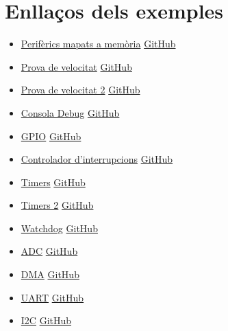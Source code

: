 \chapter*{Enllaços dels exemples}
\begin{itemize}
 \item \hyperref[sub:memory-mapped]{Perifèrics mapats a memòria} \href{https://github.com/mariusmm/cursembedded/tree/master/Simplicity/MemoryMap}{GitHub}
 \item \hyperref[sub:speedtest]{Prova de velocitat} \href{https://github.com/mariusmm/cursembedded/tree/master/Simplicity/SpeedTest_1}{GitHub}
 \item \hyperref[sub:speedtest_example]{Prova de velocitat 2} \href{https://github.com/mariusmm/cursembedded/tree/master/Simplicity/SpeedTest_2}{GitHub}
 \item \hyperref[sub:console_example]{Consola Debug} \href{https://github.com/mariusmm/cursembedded/tree/master/Simplicity/Printf_SWO}{GitHub}
 \item \hyperref[sub:GPIO_2_example]{GPIO} \href{https://github.com/mariusmm/cursembedded/tree/master/GPIO_1}{GitHub}
 \item \hyperref[sec:IRQ_example]{Controlador d'interrupcions} \href{https://github.com/mariusmm/cursembedded/tree/master/Simplicity/GPIO_2}{GitHub}
 \item \hyperref[sub:Timers_exemple]{Timers} \href{https://github.com/mariusmm/cursembedded/tree/master/Simplicity/Timer_1}{GitHub}
 \item \hyperref[sub:Timers_exemple]{Timers 2} \href{https://github.com/mariusmm/cursembedded/tree/master/Simplicity/Timer_2}{GitHub}
 \item \hyperref[sub:Watchdog_example]{Watchdog} \href{https://github.com/mariusmm/cursembedded/tree/master/Simplicity/Watchdog}{GitHub}
 \item \hyperref[sub:ADC_example]{ADC} \href{https://github.com/mariusmm/cursembedded/tree/master/Simplicity/ADC_1}{GitHub}
 \item \hyperref[sub:DMA_example]{DMA} \href{https://github.com/mariusmm/cursembedded/tree/master/Simplicity/DMA_1}{GitHub}
 \item \hyperref[sub:UART_example]{UART} \href{https://github.com/mariusmm/cursembedded/tree/master/Simplicity/UART_1}{GitHub}
 \item \hyperref[sub:I2C_example]{I2C} \href{https://github.com/mariusmm/cursembedded/tree/master/Simplicity/I2C_1}{GitHub}

\end{itemize}
